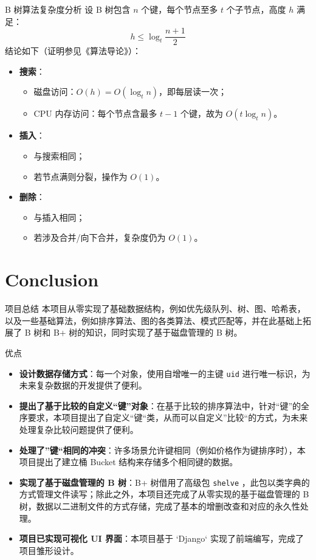 \documentclass{beamer}
\begin{document}
\begin{frame}{B 树算法复杂度分析}
设 B 树包含 $n$ 个键，每个节点至多 $t$ 个子节点，高度 $h$ 满足：
\[
h \leq \log_t \frac{n+1}{2}
\]
结论如下（证明参见《算法导论》）：
\begin{itemize}
  \item \textbf{搜索}：
  \begin{itemize}
    \item 磁盘访问：$O(h) = O(\log_t n)$，即每层读一次；
    \item CPU 内存访问：每个节点含最多 $t - 1$ 个键，故为 $O(t \log_t n)$。
  \end{itemize}
  \item \textbf{插入}：
  \begin{itemize}
    \item 与搜索相同；
    \item 若节点满则分裂，操作为 $O(1)$。
  \end{itemize}
  \item \textbf{删除}：
  \begin{itemize}
    \item 与插入相同；
    \item 若涉及合并/向下合并，复杂度仍为 $O(1)$。
  \end{itemize}
\end{itemize}
\end{frame}

\section{Conclusion}

\begin{frame}{项目总结}
本项目从零实现了基础数据结构，例如优先级队列、树、图、哈希表，以及一些基础算法，例如排序算法、图的各类算法、模式匹配等，并在此基础上拓展了 B 树和 B+ 树的知识，同时实现了基于磁盘管理的 B 树。
\end{frame}

\begin{frame}{优点}
\begin{itemize}
  \item \textbf{设计数据存储方式}：每一个对象，使用自增唯一的主键 \texttt{uid} 进行唯一标识，为未来复杂数据的开发提供了便利。
  \item \textbf{提出了基于比较的自定义“键”对象}：在基于比较的排序算法中，针对“键”的全序要求，本项目提出了自定义“键“类，从而可以自定义”比较“的方式，为未来处理复杂比较问题提供了便利。
  \item \textbf{处理了”键“相同的冲突}：许多场景允许键相同（例如价格作为键排序时），本项目提出了建立桶 Bucket 结构来存储多个相同键的数据。
  \item \textbf{实现了基于磁盘管理的 B 树}：B+ 树借用了高级包 \texttt{shelve} ，此包以类字典的方式管理文件读写；除此之外，本项目还完成了从零实现的基于磁盘管理的 B 树，数据以二进制文件的方式存储，完成了基本的增删改查和对应的永久性处理。
  \item \textbf{项目已实现可视化 UI 界面}：本项目基于 `Django` 实现了前端编写，完成了项目雏形设计。
\end{itemize}
\end{frame}
\end{document}
